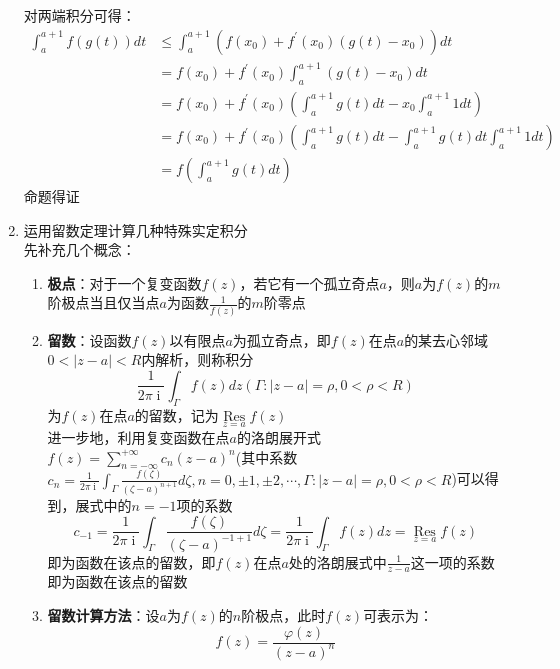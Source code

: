 \documentclass[12pt,a4paper,UTF8]{book}
\begin{document}
\begin{enumerate}
对两端积分可得：
\[\begin{aligned}
\int_{a}^{a+1}f\left(g\left(t\right)\right)dt&\leq\int_{a}^{a+1}\left(f\left(x_0\right)+f^{\prime}\left(x_0\right)\left(g\left(t\right)-x_0\right)\right)dt\\
&=f\left(x_0\right)+f^{\prime}\left(x_0\right)\int_{a}^{a+1}\left(g\left(t\right)-x_0\right)dt\\
&=f\left(x_0\right)+f^{\prime}\left(x_0\right)\left(\int_{a}^{a+1}g\left(t\right)dt-x_0\int_{a}^{a+1}1dt\right)\\
&=f\left(x_0\right)+f^{\prime}\left(x_0\right)\left(\int_{a}^{a+1}g\left(t\right)dt-\int_{a}^{a+1}g\left(t\right)dt\int_{a}^{a+1}1dt\right)\\
&=f\left(\int_{a}^{a+1}g\left(t\right)dt\right)
\end{aligned}\]
命题得证
\item 运用留数定理计算几种特殊实定积分\\
先补充几个概念：
\begin{enumerate}
\item \textbf{极点}：对于一个复变函数$f\left(z\right)$，若它有一个孤立奇点$a$，则$a$为$f\left(z\right)$的$m$阶极点当且仅当点$a$为函数$\frac{1}{f\left(z\right)}$的$m$阶零点\\
\item \textbf{留数}：设函数$f\left(z\right)$以有限点$a$为孤立奇点，即$f\left(z\right)$在点$a$的某去心邻域$0<\left|z-a\right|<R$内解析，则称积分
\[\frac{1}{2\pi\operatorname{i}}\int_{\Gamma}f\left(z\right)dz\left(\Gamma:\left|z-a\right|=\rho,0<\rho<R\right)\]
为$f\left(z\right)$在点$a$的留数，记为$\mathop{\operatorname{Res}}\limits_{z=a}f\left(z\right)$\\
进一步地，利用复变函数在点$a$的洛朗展开式$f\left(z\right)=\sum\limits_{n=-\infty}^{+\infty}c_n\left(z-a\right)^n$(其中系数$c_n=\frac{1}{2\pi\operatorname{i}}\int_{\Gamma}\frac{f\left(\zeta\right)}{\left(\zeta-a\right)^{n+1}}d\zeta,n=0,\pm1,\pm2,\cdots,\Gamma:\left|z-a\right|=\rho,0<\rho<R$)可以得到，展式中的$n=-1$项的系数
\[c_{-1}=\frac{1}{2\pi\operatorname{i}}\int_{\Gamma}\frac{f\left(\zeta\right)}{\left(\zeta-a\right)^{-1+1}}d\zeta=\frac{1}{2\pi\operatorname{i}}\int_{\Gamma}f\left(z\right)dz=\mathop{\operatorname{Res}}\limits_{z=a}f\left(z\right)\]
即为函数在该点的留数，即$f\left(z\right)$在点$a$处的洛朗展式中$\frac{1}{z-a}$这一项的系数即为函数在该点的留数\\
\item \textbf{留数计算方法}：设$a$为$f\left(z\right)$的$n$阶极点，此时$f\left(z\right)$可表示为：
\[f\left(z\right)=\frac{\varphi\left(z\right)}{\left(z-a\right)^n}\]

\end{enumerate}
\end{enumerate}
\end{document}
